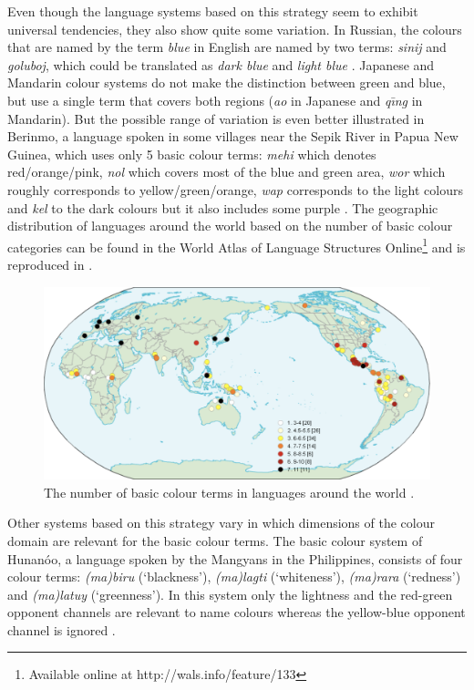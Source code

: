 Even though the language systems based on this strategy seem to
exhibit universal tendencies, they also show quite some
variation. In Russian, the colours that are named by the term \textit{blue}
in English are named by two terms: \textit{sinij} and \textit{goluboj}, which
could be translated as \textit{dark blue} and \textit{light blue}
\citep{safuanova07russian}. Japanese and Mandarin colour systems do
not make the distinction between green and blue, but use a single term
that covers both regions (\textit{ao} in Japanese and \textit{q\= \i ng} in
Mandarin). But the possible range of variation is even better
illustrated in Berinmo, a language spoken in some villages near the
Sepik River in Papua New Guinea, which uses only 5 basic colour terms:
\textit{mehi} which denotes red/orange/pink, \textit{nol} which covers most of
the blue and green area, \textit{wor} which roughly corresponds to
yellow/green/orange, \textit{wap} corresponds to the light colours and
\textit{kel} to the dark colours but it also includes some purple
\citep{roberson02color}. The geographic distribution of languages
around the world based on the number of basic colour categories can be
found in the World Atlas of Language Structures
Online\footnote{Available online at http://wals.info/feature/133} and
is reproduced in  \citep{kay08number}.

\begin{figure}[htbp]
  \begin{center}
    \includegraphics[width=\textwidth]{./intro/figures/number-bcts.pdf}
    \caption[The number of basic colour terms around the world]{The
      number of basic colour terms in languages around the world
      \citep{kay08number}.}
    \label{f:number-bcts}
  \end{center}
\end{figure}

Other systems based on this strategy vary in which dimensions of the
colour domain are relevant for the basic colour terms. The basic
colour system of Hunan\'oo, a language spoken by the Mangyans in the
Philippines, consists of four colour terms: \textit{(ma)biru} (`blackness'),
\textit{(ma)lagti} (`whiteness'), \textit{(ma)rara} (`redness') and \textit{(ma)latuy}
(`greenness'). In this system only the lightness and the red-green
opponent channels are relevant to name colours whereas the yellow-blue
opponent channel is ignored \citep{conklin55hanunoo}.

